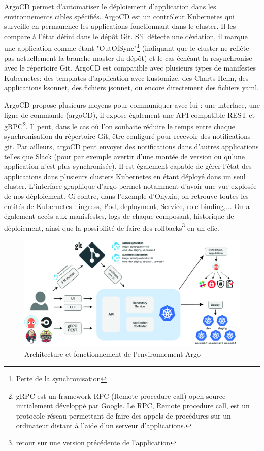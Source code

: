 \documentclass[11pt,fleqn]{book} %
\begin{document}
ArgoCD permet d'automatiser le déploiement d'application dans les environnements cibles spécifiés. ArgoCD est un contrôleur Kubernetes qui surveille en permanence les applications fonctionnant dans le cluster. Il les compare à l'état défini dans le dépôt Git. S'il détecte une déviation, il marque une application comme étant "OutOfSync"\footnote{Perte de la synchronisation} (indiquant que le cluster ne reflète pas actuellement la branche master du dépôt) et le cas échéant la resynchronise avec le répertoire Git.  ArgoCD est compatible avec plusieurs types de manifestes Kubernetes: des templates d'application avec kustomize, des Charts Helm, des applications ksonnet, des fichiers jsonnet, ou encore directement des fichiers yaml.\newline



ArgoCD propose plusieurs moyens pour communiquer avec lui : une interface, une ligne de commande (argoCD), il expose également une API compatible REST et gRPC\footnote{gRPC est un framework RPC (Remote procedure call) open source initialement développé par Google. Le RPC, Remote procedure call, est un protocole réseau permettant de faire des appels de procédures sur un ordinateur distant à l'aide d'un serveur d'applications.}. Il peut, dans le cas où l'on souhaite réduire le temps entre chaque synchronisation du répertoire Git, être configuré pour recevoir des notifications git. Par ailleurs, argoCD peut envoyer des notifications dans d'autres applications telles que Slack (pour par exemple avertir d'une montée de version ou qu'une application n'est plus synchronisée). Il est également capable de gérer l'état des applications dans plusieurs clusters Kubernetes en étant déployé dans un seul cluster.
L'interface graphique d'argo permet notamment d'avoir une vue explosée de nos déploiement. Ci contre, dans l'exemple d'Onyxia, on retrouve toutes les entités de Kubernetes : ingress, Pod, deployment, Service, role-binding,... On a également accès aux manisfestes, logs de chaque composant, historique de déploiement, ainsi que la possibilité de faire des rollbacks\footnote{retour sur une version précédente de l'application} en un clic.

\begin{figure}[H]
\renewcommand{\figurename}{Schéma}
\includegraphics[scale=0.1]{Pictures/CI-CD/argocd_architecture.png}
\captionsetup{margin=1.5cm,format=hang,justification=justified}
\caption[]{Architecture et fonctionnement de l'environnement Argo \newline}
\end{figure}
\end{document}
